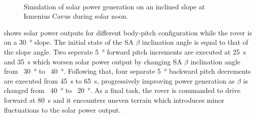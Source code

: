 \begin{figure}[h]
\begin{subfigure}[t]{\subfigureWidth}
		\label{fig:sub:rover-slope-compensation-power-profile}
	\end{subfigure}\\[0.8ex]
    \caption[Simulation of solar power generation on an inclined slope]
            {Simulation of solar power generation on an inclined slope at Ismenius Cavus during solar noon.}
    \label{fig:rover-slope-compensation}
\vspace{-2ex}
\end{figure}

\clearpage

 shows solar power outputs for different body-pitch configuration while the rover is on a \SI{30}{\degree} slope. The initial state of the \ac{SA} $\beta$ inclination angle is equal to that of the slope angle. Two seperate \SI{5}{\degree} forward pitch increments are executed at \SI{25}{\second} and \SI{35}{\second} which worsen solar power output by changing \ac{SA} $\beta$ inclination angle from ~\SI{30}{\degree} to ~\SI{40}{\degree}. Following that, four separate \SI{5}{\degree} backward pitch decrements are executed from \SI{45}{\second} to \SI{65}{\second}, progressively improving power generation as $\beta$ is changed from ~\SI{40}{\degree} to ~\SI{20}{\degree}. As a final task, the rover is commanded to drive forward at \SI{80}{\second} and it encounters uneven terrain which introduces minor fluctuations to the solar power output.
